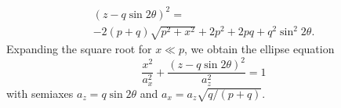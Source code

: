 \documentclass[preprint]{iucr}       %
\begin{document}
\begin{multline}
\label{eqn:ellipse}
(z - q \sin2\theta)^2 = \\
-2 (p + q) \sqrt{p^2 + x^2}+ 
2 p^2 +2 p q + q^2 \sin^2 2 \theta.
\end{multline}
Expanding the square root for $x\ll p$, we obtain the ellipse equation
\begin{equation}
\label{eqn:ellipse}
\frac{x^2}{a_x^2} + \frac{(z-q \sin2\theta)^2}{a_z^2}=1
\end{equation}
with semiaxes $a_z=q \sin2\theta$ and $a_x=a_z\sqrt{q/(p+q)}$.






% 
% 
% 
% 
\end{document}
